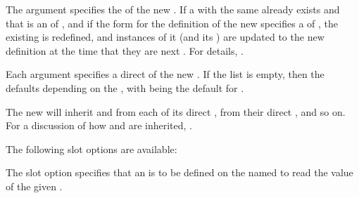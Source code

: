 The  argument specifies the  
of the new .  
If a  with the same  already exists 
 and that  is an  of , 
 and if the  form for the definition of the new 
      specifies a  of  ,
the existing  is redefined,
and instances of it (and its ) are updated 
 to the new definition at the time that they are next .
For details, \seesection\ClassReDef.

 
Each  argument 
specifies a direct  of the new .  
If the  list is empty, then the 
defaults depending on the , 
with  being the
default for .

The new  will
inherit  and  
from each of its direct , from
their direct , and so on.  
For a discussion of how  and  are inherited,
\seesection\Inheritance.
 
 
The following slot options are available:
 
\beginlist
 
\itemitem{\bull}
The  slot option specifies that an  is
to be defined on the  named 
to read the value of the given .
 
